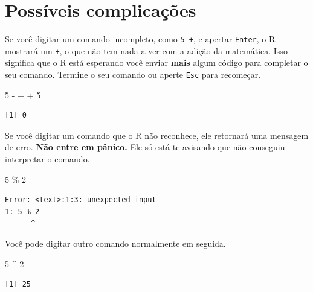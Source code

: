 \documentclass[
  letterpaper,
  DIV=11,
  numbers=noendperiod]{scrreprt}
\newenvironment{Shaded}{\begin{snugshade}}{\end{snugshade}}
\newcommand{\DecValTok}[1]{\textcolor[rgb]{0.68,0.00,0.00}{#1}}
\newcommand{\NormalTok}[1]{\textcolor[rgb]{0.00,0.23,0.31}{#1}}
\newcommand{\SpecialCharTok}[1]{\textcolor[rgb]{0.37,0.37,0.37}{#1}}
\begin{document}
\section{Possíveis complicações}\label{possuxedveis-complicauxe7uxf5es}

Se você digitar um comando incompleto, como \texttt{5\ +}, e apertar
\texttt{Enter}, o R mostrará um \texttt{+}, o que não tem nada a ver com
a adição da matemática. Isso significa que o R está esperando você
enviar \textbf{mais} algum código para completar o seu comando. Termine
o seu comando ou aperte \texttt{Esc} para recomeçar.

\begin{Shaded}
\begin{Highlighting}[]
\DecValTok{5} \SpecialCharTok{{-}}
\SpecialCharTok{+} 
\SpecialCharTok{+} \DecValTok{5}
\end{Highlighting}
\end{Shaded}

\begin{verbatim}
[1] 0
\end{verbatim}

Se você digitar um comando que o R não reconhece, ele retornará uma
mensagem de erro. \textbf{Não entre em pânico.} Ele só está te avisando
que não conseguiu interpretar o comando.

\begin{Shaded}
\begin{Highlighting}[]
\DecValTok{5}\NormalTok{ \% }\DecValTok{2}
\end{Highlighting}
\end{Shaded}

\begin{verbatim}
Error: <text>:1:3: unexpected input
1: 5 % 2
      ^
\end{verbatim}

Você pode digitar outro comando normalmente em seguida.

\begin{Shaded}
\begin{Highlighting}[]
\DecValTok{5} \SpecialCharTok{\^{}} \DecValTok{2}
\end{Highlighting}
\end{Shaded}

\begin{verbatim}
[1] 25
\end{verbatim}
\end{document}
